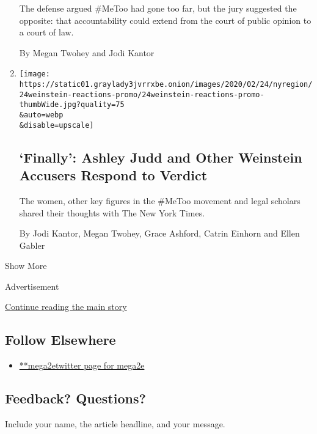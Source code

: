 \begin{enumerate}
  The defense argued \#MeToo had gone too far, but the jury suggested
  the opposite: that accountability could extend from the court of
  public opinion to a court of law.

  By Megan Twohey and Jodi Kantor
\item
  \href{/2020/02/24/nyregion/harvey-weinstein-accusers.html}{}

  \texttt{[image: https://static01.graylady3jvrrxbe.onion/images/2020/02/24/nyregion/24weinstein-reactions-promo/24weinstein-reactions-promo-thumbWide.jpg?quality=75\\\&auto=webp\\\&disable=upscale]}

  \hypertarget{finally-ashley-judd-and-other-weinstein-accusers-respond-to-verdict}{%
  \subsection{`Finally': Ashley Judd and Other Weinstein Accusers
  Respond to
  Verdict}\label{finally-ashley-judd-and-other-weinstein-accusers-respond-to-verdict}}

  The women, other key figures in the \#MeToo movement and legal
  scholars shared their thoughts with The New York Times.

  By Jodi Kantor, Megan Twohey, Grace Ashford, Catrin Einhorn and Ellen
  Gabler
\end{enumerate}

Show More

Advertisement

\protect\hyperlink{after-mid2}{Continue reading the main story}

\hypertarget{follow-elsewhere}{%
\subsection{Follow Elsewhere}\label{follow-elsewhere}}

\begin{itemize}
\tightlist
\item
  \href{https://twitter.com/mega2e}{**mega2etwitter page for mega2e}
\end{itemize}

\hypertarget{feedback-questions}{%
\subsection{Feedback? Questions?}\label{feedback-questions}}

Include your name, the article headline, and your message.

